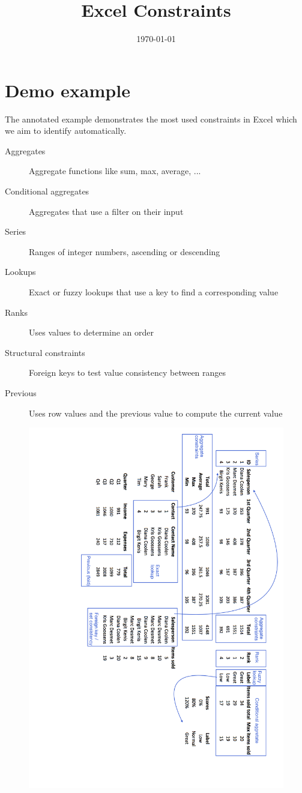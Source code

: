\documentclass[a4paper]{article}
\title{Excel Constraints}
\date{\today}
\begin{document}
\maketitle


\section{Demo example} %
\label{sec:demo_example}
The annotated example demonstrates the most used constraints in Excel which we aim to identify automatically.

\begin{description}
	\item[Aggregates] Aggregate functions like sum, max, average, ...
	\item[Conditional aggregates] Aggregates that use a filter on their input
	\item[Series] Ranges of integer numbers, ascending or descending
	\item[Lookups] Exact or fuzzy lookups that use a key to find a corresponding value
	\item[Ranks] Uses values to determine an order
	\item[Structural constraints] Foreign keys to test value consistency between ranges
	\item[Previous] Uses row values and the previous value to compute the current value
\end{description}

\begin{figure}
  \centering
    \includegraphics[width=1\linewidth]{../Demo.png}
  \label{fig:demo}
\end{figure}
\end{document}
